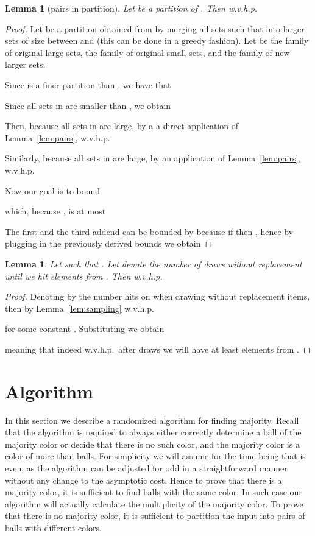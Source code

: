 \documentclass{article}[11pt,a4paper]
\newtheorem{lemma}[definition]{Lemma}
\begin{document}
\begin{lemma}[pairs in partition]
\label{lem:pairs2}
Let  be a partition of .  Then w.v.h.p.

\end{lemma}

\begin{proof}
Let  be a partition  obtained from  by merging all sets  such that  into larger sets of size between  and  (this can be done in a greedy fashion). Let  be the family of original large sets,  the family of original small sets, and  the family of new larger sets.

Since  is a finer partition than , we have that

Since all sets in  are smaller than , we obtain

Then, because all sets in  are large, by a a direct application of Lemma~\ref{lem:pairs}, w.v.h.p.

Similarly, because all sets in  are large, by an application of Lemma~\ref{lem:pairs}, w.v.h.p.

Now our goal is to bound

which, because , is at most

The first and the third addend can be bounded by  because if  then , hence by plugging in the previously derived bounds we obtain

\end{proof}

\begin{lemma}
\label{lem:drawing_until}
Let  such that . Let  denote the number of draws without replacement until we hit  elements from . Then w.v.h.p.

\end{lemma}

\begin{proof}
Denoting by  the number hits on  when drawing without replacement  items, then
by Lemma~\ref{lem:sampling} w.v.h.p.

for some constant . Substituting  we obtain

meaning that indeed w.v.h.p.\ after  draws we will have at least  elements from .
\end{proof}

\section{Algorithm}

In this section we describe a randomized algorithm for finding majority. Recall
that the algorithm is required to always either correctly determine a ball of the majority
color or decide that there is no such color, and the majority color is a color of more
than  balls. For simplicity we will assume for the time being that
 is even, as the algorithm can be adjusted for odd  in a straightforward manner without any change to the asymptotic cost.
Hence to prove that there is a majority color, it is sufficient to find  balls
with the same color. In such case our algorithm will actually calculate the multiplicity
of the majority color. To prove that there is no majority color, it is sufficient to partition
the input into  pairs of balls with different colors.
\end{document}
